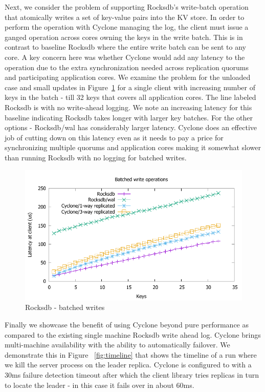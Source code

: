 \documentclass[10pt, preprint, nonatbib]{sigplanconf}
\begin{document}
Next, we consider the problem of supporting Rocksdb's write-batch operation that
atomically writes a set of key-value pairs into the KV store. In order to
perform the operation with Cyclone managing the log, the client must issue a
ganged operation across cores owning the keys in the write batch. This is in
contrast to baseline Rocksdb where the entire write batch can be sent to any
core. A key concern here was whether Cyclone would add any latency to the
operation due to the extra synchronization needed across replication quorums and
participating application cores. We examine the problem for the unloaded case
and small updates in Figure~\ref{fig:rocksdb_multi} for a single client with
increasing number of keys in the batch - till 32 keys that covers all
application cores. The line labeled Rocksdb is with no write-ahead logging. We
note an increasing latency for this baseline indicating Rocksdb takes longer
with larger key batches. For the other options - Rocksdb/wal has considerably
larger latency. Cyclone does an effective job of cutting down on this latency
even as it needs to pay a price for synchronizing multiple quorums and
application cores making it somewhat slower than running Rocksdb with no logging
for batched writes.

\begin{figure}
\includegraphics[scale=0.6]{results2/rocksdb_multi.pdf}
\caption{Rocksdb - batched writes}
\label{fig:rocksdb_multi}
\end{figure}

Finally we showcase the benefit of using Cyclone beyond pure performance as
compared to the existing single machine Rocksdb write ahead log. Cyclone brings
multi-machine availability with the ability to automatically failover. We
demonstrate this in Figure ~\ref{fig:timeline} that shows the timeline of a run
where we kill the server process on the leader replica. Cyclone is configured to
with a 30ms failure detection timeout after which the client library tries
replicas in turn to locate the leader - in this case it fails over in about
60ms.
\end{document}
